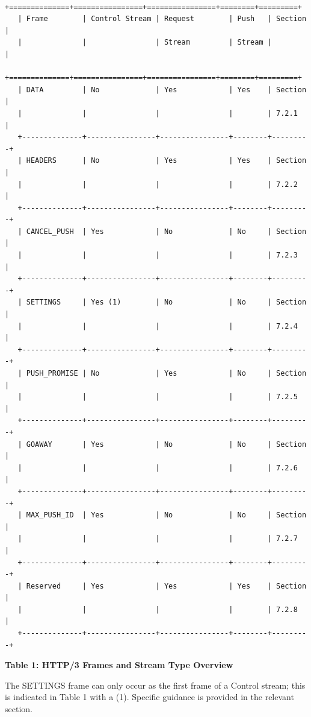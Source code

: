 \documentclass{article}
\begin{document}
\begin{verbatim}
   +==============+================+================+========+=========+
   | Frame        | Control Stream | Request        | Push   | Section |
   |              |                | Stream         | Stream |         |
   +==============+================+================+========+=========+
   | DATA         | No             | Yes            | Yes    | Section |
   |              |                |                |        | 7.2.1   |
   +--------------+----------------+----------------+--------+---------+
   | HEADERS      | No             | Yes            | Yes    | Section |
   |              |                |                |        | 7.2.2   |
   +--------------+----------------+----------------+--------+---------+
   | CANCEL_PUSH  | Yes            | No             | No     | Section |
   |              |                |                |        | 7.2.3   |
   +--------------+----------------+----------------+--------+---------+
   | SETTINGS     | Yes (1)        | No             | No     | Section |
   |              |                |                |        | 7.2.4   |
   +--------------+----------------+----------------+--------+---------+
   | PUSH_PROMISE | No             | Yes            | No     | Section |
   |              |                |                |        | 7.2.5   |
   +--------------+----------------+----------------+--------+---------+
   | GOAWAY       | Yes            | No             | No     | Section |
   |              |                |                |        | 7.2.6   |
   +--------------+----------------+----------------+--------+---------+
   | MAX_PUSH_ID  | Yes            | No             | No     | Section |
   |              |                |                |        | 7.2.7   |
   +--------------+----------------+----------------+--------+---------+
   | Reserved     | Yes            | Yes            | Yes    | Section |
   |              |                |                |        | 7.2.8   |
   +--------------+----------------+----------------+--------+---------+
\end{verbatim}

\begin{center}
\textbf{Table 1: HTTP/3 Frames and Stream Type Overview}
\end{center}

The SETTINGS frame can only occur as the first frame of a Control stream; this is indicated in Table 1 with a (1).  Specific guidance is provided in the relevant section.
\end{document}
